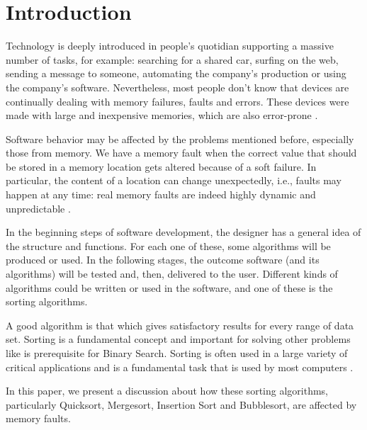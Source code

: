 \section{Introduction}
Technology is deeply introduced in people's quotidian supporting a massive number of tasks, for example: searching for a shared car, surfing on the web, sending a message to someone, automating the company's production or using the company's software. Nevertheless, most people don't know that devices are continually dealing with memory failures, faults and errors. These devices were made with large and inexpensive memories, which are also error-prone \cite{Finocchi2004}.

Software behavior may be affected by the problems mentioned before, especially those from memory. We have a memory fault when the correct value that should be stored in a memory location gets altered because of a soft failure. In particular, the content of a location can change unexpectedly, i.e., faults may happen at any time: real memory faults are indeed highly dynamic and unpredictable \cite{Hamdioui2003}.

In the beginning steps of software development, the designer has a general idea of the structure and functions. For each one of these, some algorithms will be produced or used. In the following stages, the outcome software (and its algorithms) will be tested and, then, delivered to the user. Different kinds of algorithms could be written or used in the software, and one of these is the sorting algorithms.

A good algorithm is that which gives satisfactory results for every range of data set. Sorting is a fundamental concept and important for solving other problems like is prerequisite for Binary Search. Sorting is often used in a large variety of critical applications and is a fundamental task that is used by most computers \cite{NitinArora}.

In this paper, we present a discussion about how these sorting algorithms, particularly Quicksort, Mergesort, Insertion Sort and Bubblesort, are affected by memory faults.